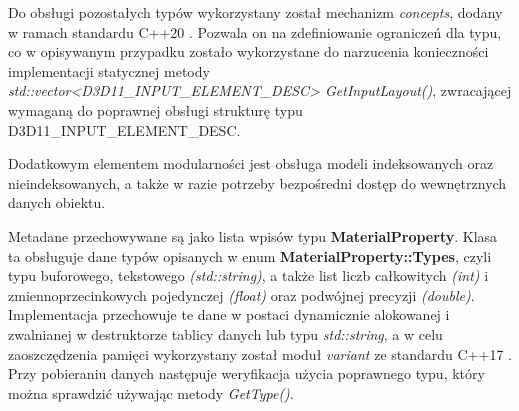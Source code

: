 	Do obsługi pozostałych typów wykorzystany został mechanizm \textit{concepts}, dodany w ramach standardu C++20 \cite{cpp20:concepts:2025}.
	Pozwala on na zdefiniowanie ograniczeń dla typu, co w opisywanym przypadku zostało wykorzystane do narzucenia konieczności implementacji statycznej metody \textit{std::vector<D3D11\_INPUT\_ELEMENT\_DESC> GetInputLayout()}, zwracającej wymaganą do poprawnej obsługi strukturę typu D3D11\_INPUT\_ELEMENT\_DESC.

	Dodatkowym elementem modularności jest obsługa modeli indeksowanych oraz nieindeksowanych, a także w razie potrzeby bezpośredni dostęp do wewnętrznych danych obiektu.
	
	Metadane przechowywane są jako lista wpisów typu \textbf{MaterialProperty}. Klasa ta obsługuje dane typów opisanych w enum \textbf{MaterialProperty::Types}, czyli typu buforowego, tekstowego \textit{(std::string)}, a także list liczb całkowitych \textit{(int)} i zmiennoprzecinkowych pojedynczej \textit{(float)} oraz podwójnej precyzji \textit{(double)}. Implementacja przechowuje te dane w postaci dynamicznie alokowanej i zwalnianej w destruktorze tablicy danych lub typu \textit{std::string}, a w celu zaoszczędzenia pamięci wykorzystany został moduł \textit{variant} ze standardu C++17 \cite{cpp17:variant:2025}. Przy pobieraniu danych następuje weryfikacja użycia poprawnego typu, który można sprawdzić używając metody \textit{GetType()}.
	
